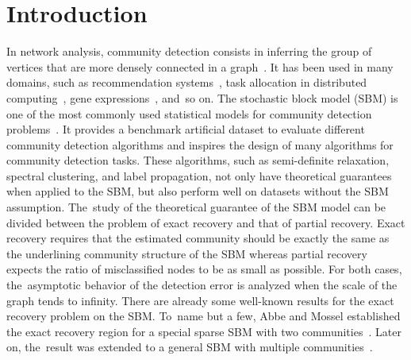 \documentclass[entropy,article,accept,moreauthors,pdftex]{Definitions/mdpi}
\newcommand{\1}{\mathbbm{1}}
\begin{document}


\section{Introduction}
In network analysis, community detection consists in inferring the group of vertices that
are more densely connected in a graph~\cite{fortunato2010community}. It has been used in many domains, such as recommendation systems~\cite{feng2015personalized},
task allocation in distributed computing~\cite{hendrickson2000graph}, gene expressions~\cite{cline2007integration}, and~so on.
The stochastic block model (SBM) is one of the most commonly used statistical models for community detection problems~\cite{holland1983stochastic, abbe2017community}.
It provides a benchmark artificial dataset to evaluate different community detection algorithms
and inspires the design of many algorithms for community detection tasks. These algorithms, such as
semi-definite relaxation, spectral clustering, and label propagation, not only have theoretical guarantees when applied to the SBM,
but also perform well on datasets without the SBM assumption. The~study of the theoretical guarantee of the SBM model can be divided between
the problem of exact recovery and that of partial recovery. Exact recovery requires that the estimated community should be exactly
the same as the underlining community structure of the SBM whereas partial recovery expects the ratio of misclassified nodes to be as small as possible.
For both cases, the~asymptotic behavior of the detection error
is analyzed when the scale of the graph tends to infinity. There are already some well-known results for the exact recovery problem
on the SBM.	To~name but a few, Abbe and Mossel established the exact recovery region for a special sparse SBM with two communities~\cite{abbe2015exact, mossel2016}.
Later on, the~result was extended to a general SBM with multiple communities~\cite{abbe2015community}.
\end{document}
